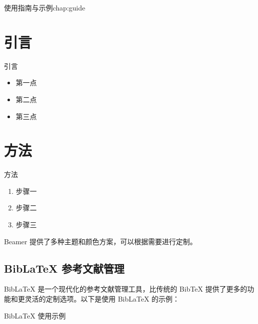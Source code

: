 \begin{cuzchapter}{使用指南与示例}{chap:guide}
\begin{listing}[htbp]
\begin{texcode}
            \section{引言}

            \begin{frame}{引言}
                \begin{itemize}
                    \item 第一点
                    \item 第二点
                    \item 第三点
                \end{itemize}
            \end{frame}

            \section{方法}

            \begin{frame}{方法}
                \begin{enumerate}
                    \item 步骤一
                    \item 步骤二
                    \item 步骤三
                \end{enumerate}
            \end{frame}

            
        \end{texcode}
    \end{listing}

    Beamer 提供了多种主题和颜色方案，可以根据需要进行定制。

    \subsection{BibLaTeX 参考文献管理}\label{sub:biblatex}

    BibLaTeX 是一个现代化的参考文献管理工具，比传统的 BibTeX 提供了更多的功能和更灵活的定制选项。以下是使用 BibLaTeX 的示例：

    \begin{listing}[htbp]
        \caption{BibLaTeX 使用示例}
        \label{code:biblatex-example}
        \begin{texcode}
            \usepackage[
                backend=biber,
                style=gb7714-2015,
                sorting=nyt,
                giveninits=true
            ]{biblatex}


\end{texcode}
\end{listing}
\end{cuzchapter}
